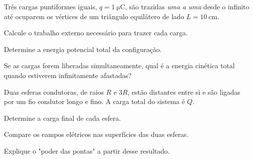 \begin{questao}[3]{}

Três cargas puntiformes iguais, $q = \SI{1}{\micro\coulomb}$, são trazidas
\emph{uma a uma} desde o infinito até ocuparem os vértices de um triângulo
equilátero de lado $L = \SI{10}{\centi\meter}$.
\begin{itensq}
\item Calcule o trabalho externo necessário para trazer cada carga.
\item Determine a energia potencial total da configuração.
\item Se as cargas forem liberadas simultaneamente, qual é a energia cinética total
      quando estiverem infinitamente afastadas?
\end{itensq}


\end{questao}
\begin{questao}[3]{}

Duas esferas condutoras, de raios $R$ e $3R$, estão distantes entre si e são
ligadas por um fio condutor longo e fino. A carga total do sistema é $Q$.
\begin{itensq}
\item Determine a carga final de cada esfera.
\item Compare os campos elétricos nas superfícies das duas esferas.
\item Explique o "poder das pontas" a partir desse resultado.
\end{itensq}


\end{questao}

